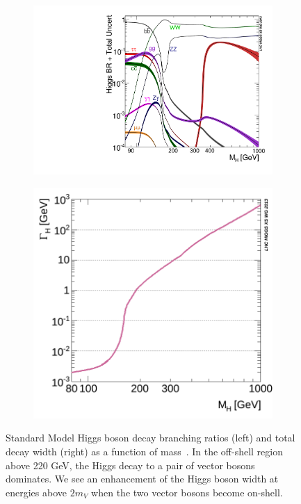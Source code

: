 \begin{figure}[!h]
\centering
\begin{subfigure}[t]{0.45\textwidth}
    \includegraphics[width=\textwidth]{figures/Higgs_BR.pdf}
    \label{fig:HiggsBR}
\end{subfigure}
\begin{subfigure}[t]{0.45\textwidth}
    \includegraphics[width=\textwidth]{figures/SM_Width.png}
    \label{fig:SMwidth}
\end{subfigure}
\caption{Standard Model Higgs boson decay branching ratios (left) and total decay width (right) as a function of mass~\cite{YR4}. In the off-shell region above 220 GeV, the Higgs decay to a pair of vector bosons dominates. We see an enhancement of the Higgs boson width at energies above $2m_V$ when the two vector bosons become on-shell.}
\end{figure}
\label{fig:HiggsDecay}

